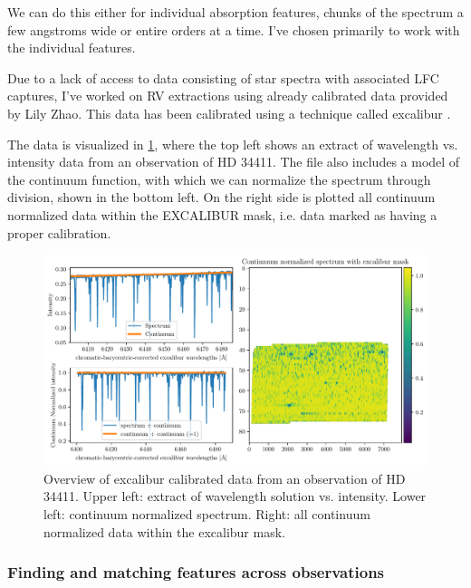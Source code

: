     We can do this either for individual absorption features, chunks of the spectrum a few angstroms wide or entire orders at a time. I've chosen primarily to work with the individual features.

    Due to a lack of access to data consisting of star spectra with associated LFC captures, I've worked on RV extractions using already calibrated data provided by Lily Zhao. This data has been calibrated using a technique called excalibur \cite{zhao2021excalibur}.
    
    The data is visualized in \ref{fig:rv_data_overview}, where the top left shows an extract of wavelength vs. intensity data from an observation of HD 34411. The file also includes a model of the continuum function, with which we can normalize the spectrum through division, shown in the bottom left. On the right side is plotted all continuum normalized data within the EXCALIBUR mask, i.e. data marked as having a proper calibration.

    \begin{figure}%
        \begin{wide}  
            \includegraphics[width=\textwidth]{figures/rv_data_overview.pdf}
            \caption{Overview of excalibur calibrated data from an observation of HD 34411. Upper left: extract of wavelength solution vs. intensity. Lower left: continuum normalized spectrum. Right: all continuum normalized data within the excalibur mask.}
            \label{fig:rv_data_overview}
        \end{wide}
    \end{figure}
            
    \subsubsection{Finding and matching features across observations}

